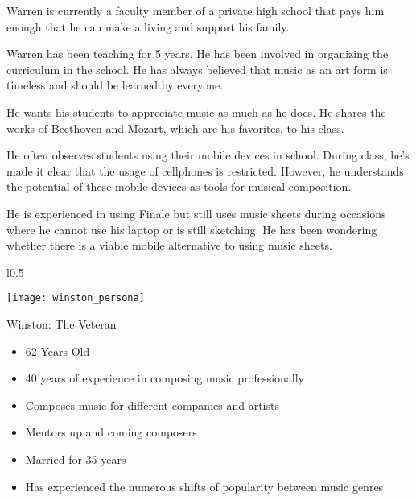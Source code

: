 Warren is currently a faculty member of a private high school that pays him enough that he can make a living and support his family.

Warren has been teaching for 5 years. He has been involved in organizing the curriculum in the school. He has always believed that music as an art form is timeless and should be learned by everyone.

He wants his students to appreciate music as much as he does. He shares the works of Beethoven and Mozart, which are his favorites, to his class.


He often observes students using their mobile devices in school. During class, he's made it clear that the usage of cellphones is restricted. However, he understands the potential of these mobile devices as tools for musical composition.


He is experienced in using Finale but still uses music sheets during occasions where he cannot use his laptop or is still sketching. He has been wondering whether there is a viable mobile alternative to using music sheets. \newline




\begin{wrapfigure}{l}{0.5\textwidth}
  \begin{center}
    \texttt{[image: winston\_persona]}
  \end{center}
\end{wrapfigure}

Winston: The Veteran \newline

\begin{itemize}
\item 62 Years Old
\item 40 years of experience in composing music professionally
\item Composes music for different companies and artists
\item Mentors up and coming composers
\item Married for 35 years
\item Has experienced the numerous shifts of popularity between music genres
\end{itemize}

